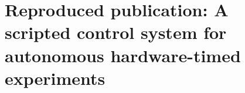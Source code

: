 








\section{Reproduced publication: A scripted control system for autonomous hardware-timed experiments}

